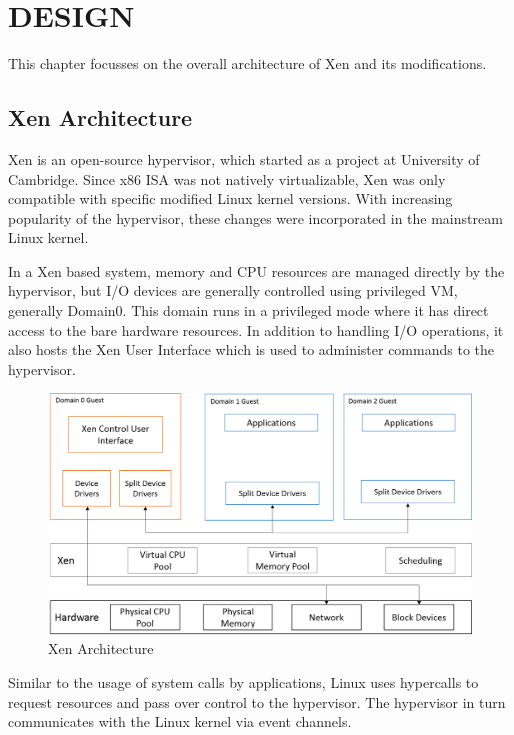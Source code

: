 \chapter{\uppercase{Design}}

This chapter focusses on the overall architecture of Xen and its modifications.
\section{Xen Architecture}

Xen is an open-source hypervisor, which started as a project at University of Cambridge. Since x86 ISA was not natively virtualizable, Xen was only compatible with specific modified Linux kernel versions. With increasing popularity of the hypervisor, these changes were incorporated in the mainstream Linux kernel.

In a Xen based system, memory and CPU resources are managed directly by the hypervisor, but I/O devices are generally controlled using privileged VM, generally Domain0. This domain runs in a privileged mode where it has direct access to the bare hardware resources. In addition to handling I/O operations, it also hosts the Xen User Interface which is used to administer commands to the hypervisor.



\begin{figure}
\centering
\includegraphics[scale=0.6]{figures/Xen_model.png}
\caption{Xen Architecture}
\label{fig:xen_model}
\end{figure}

Similar to the usage of system calls by applications, Linux uses hypercalls to request resources and pass over control to the hypervisor. The hypervisor in turn communicates with the Linux kernel via event channels.

